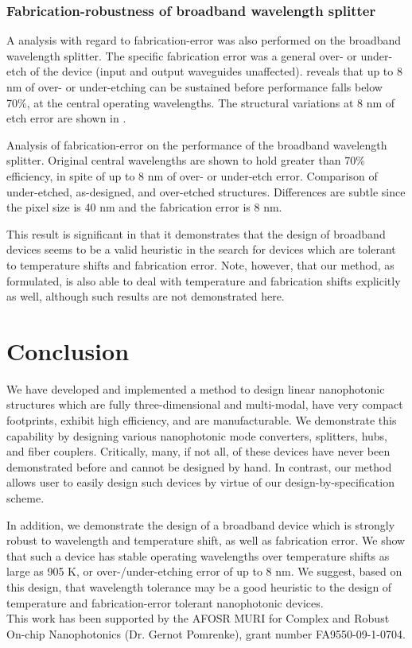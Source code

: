 \documentclass[letterpaper,10pt]{article}
\begin{document}
\subsubsection{Fabrication-robustness of broadband wavelength splitter}
A analysis with regard to fabrication-error
    was also performed on the broadband wavelength splitter.
The specific fabrication error was a general over- or under-etch
    of the device (input and output waveguides unaffected).
 reveals that up to 8 nm of over- or under-etching
    can be sustained before performance falls below 70\%, at the central
    operating wavelengths.
The structural variations at 8 nm of etch error are shown in .
    
    {Analysis of fabrication-error on the performance of the broadband 
    wavelength splitter.
    Original central wavelengths are shown to hold greater than 70\% efficiency,
    in spite of up to 8 nm of over- or under-etch error.}
    {Comparison of under-etched, as-designed, and over-etched structures.
    Differences are subtle since the pixel size is 40 nm and the
    fabrication error is 8 nm.}

This result is significant in that it demonstrates
    that the design of broadband devices
    seems to be a valid heuristic in the search for 
    devices which are tolerant to temperature shifts and fabrication error.
Note, however, that our method, as formulated, is also able to
    deal with temperature and fabrication shifts explicitly as well,
    although such results are not demonstrated here.

\section{Conclusion}
We have developed and implemented a method to design linear nanophotonic structures
    which are fully three-dimensional and multi-modal,
    have very compact footprints,
    exhibit high efficiency, and
    are manufacturable.
We demonstrate this capability by designing various nanophotonic mode converters,
    splitters, hubs, and fiber couplers.
Critically, many, if not all, of these devices have never been demonstrated before
    and cannot be designed by hand.
In contrast, our method allows user to easily design such devices
    by virtue of our design-by-specification scheme.

In addition, we demonstrate the design of a broadband device 
    which is strongly robust to wavelength and temperature shift,
    as well as fabrication error.
We show that such a device has stable operating wavelengths 
    over temperature shifts as large as 905 K,
    or over-/under-etching error of up to 8 nm.
We suggest, based on this design, that wavelength tolerance
    may be a good heuristic to the design of temperature and fabrication-error
    tolerant nanophotonic devices. \\

This work has been supported by the 
    AFOSR MURI for Complex and Robust On-chip Nanophotonics 
    (Dr. Gernot Pomrenke), grant number FA9550-09-1-0704.
\end{document}
